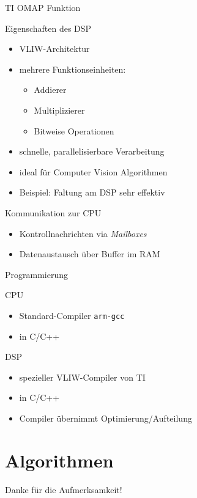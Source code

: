 \documentclass{beamer}
\begin{document}
		\begin{frame}{TI OMAP Funktion}
		  \begin{block}{Eigenschaften des DSP}
		    \begin{itemize}
		      \item VLIW-Architektur
		      \item mehrere Funktionseinheiten:
		      \begin{itemize}
            \item Addierer
            \item Multiplizierer
            \item Bitweise Operationen
          \end{itemize}
		      \item schnelle, parallelisierbare Verarbeitung
		      \item ideal für Computer Vision Algorithmen
		      \item Beispiel: Faltung am DSP sehr effektiv
		    \end{itemize}
		  \end{block}
		  
		  \begin{block}{Kommunikation zur CPU}
	      \begin{itemize}
          \item Kontrollnachrichten via \emph{Mailboxes}
          \item Datenaustausch über Buffer im RAM
        \end{itemize}
      \end{block}
		\end{frame}
		
		\begin{frame}{Programmierung}
		  \begin{block}{CPU}
		    \begin{itemize}
          \item Standard-Compiler \texttt{arm-gcc}
		      \item in C/C++
		    \end{itemize}
		  \end{block}
		  
		  \begin{block}{DSP}
        \begin{itemize}
          \item spezieller VLIW-Compiler von TI
          \item in C/C++
          \item Compiler übernimmt Optimierung/Aufteilung
        \end{itemize}
      \end{block}
		\end{frame}
		
		
  \section{Algorithmen}
    
    
  
				
		\begin{frame}
			\begin{center}
				\begin{large}
					Danke für die Aufmerksamkeit!
				\end{large}
			\end{center}
		\end{frame}
\end{document}
